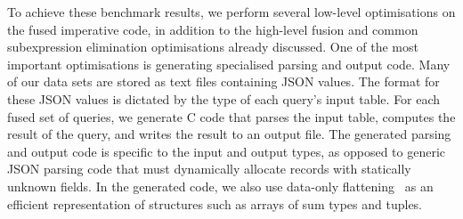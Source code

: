To achieve these benchmark results, we perform several low-level optimisations on the fused imperative code, in addition to the high-level fusion and common subexpression elimination optimisations already discussed.
One of the most important optimisations is generating specialised parsing and output code.
Many of our data sets are stored as text files containing JSON values.
The format for these JSON values is dictated by the type of each query's input table.
For each fused set of queries, we generate C code that parses the input table, computes the result of the query, and writes the result to an output file.
The generated parsing and output code is specific to the input and output types, as opposed to generic JSON parsing code that must dynamically allocate records with statically unknown fields.
In the generated code, we also use data-only flattening~\cite{bergstrom2013data} as an efficient representation of structures such as arrays of sum types and tuples.



